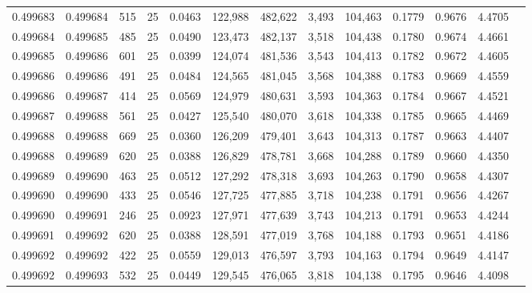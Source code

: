 \begin{tabular}{rrrrrrrrrrrrr}
0.499683 & 0.499684 &   515 &  25 &                                     0.0463 & 122,988 & 482,622 &   3,493 & 104,463 & 0.1779 & 0.9676 & 4.4705 \\
0.499684 & 0.499685 &   485 &  25 &                                     0.0490 & 123,473 & 482,137 &   3,518 & 104,438 & 0.1780 & 0.9674 & 4.4661 \\
0.499685 & 0.499686 &   601 &  25 &                                     0.0399 & 124,074 & 481,536 &   3,543 & 104,413 & 0.1782 & 0.9672 & 4.4605 \\
0.499686 & 0.499686 &   491 &  25 &                                     0.0484 & 124,565 & 481,045 &   3,568 & 104,388 & 0.1783 & 0.9669 & 4.4559 \\
0.499686 & 0.499687 &   414 &  25 &                                     0.0569 & 124,979 & 480,631 &   3,593 & 104,363 & 0.1784 & 0.9667 & 4.4521 \\
0.499687 & 0.499688 &   561 &  25 &                                     0.0427 & 125,540 & 480,070 &   3,618 & 104,338 & 0.1785 & 0.9665 & 4.4469 \\
0.499688 & 0.499688 &   669 &  25 &                                     0.0360 & 126,209 & 479,401 &   3,643 & 104,313 & 0.1787 & 0.9663 & 4.4407 \\
0.499688 & 0.499689 &   620 &  25 &                                     0.0388 & 126,829 & 478,781 &   3,668 & 104,288 & 0.1789 & 0.9660 & 4.4350 \\
0.499689 & 0.499690 &   463 &  25 &                                     0.0512 & 127,292 & 478,318 &   3,693 & 104,263 & 0.1790 & 0.9658 & 4.4307 \\
0.499690 & 0.499690 &   433 &  25 &                                     0.0546 & 127,725 & 477,885 &   3,718 & 104,238 & 0.1791 & 0.9656 & 4.4267 \\
0.499690 & 0.499691 &   246 &  25 &                                     0.0923 & 127,971 & 477,639 &   3,743 & 104,213 & 0.1791 & 0.9653 & 4.4244 \\
0.499691 & 0.499692 &   620 &  25 &                                     0.0388 & 128,591 & 477,019 &   3,768 & 104,188 & 0.1793 & 0.9651 & 4.4186 \\
0.499692 & 0.499692 &   422 &  25 &                                     0.0559 & 129,013 & 476,597 &   3,793 & 104,163 & 0.1794 & 0.9649 & 4.4147 \\
0.499692 & 0.499693 &   532 &  25 &                                     0.0449 & 129,545 & 476,065 &   3,818 & 104,138 & 0.1795 & 0.9646 & 4.4098 \\

\end{tabular}
